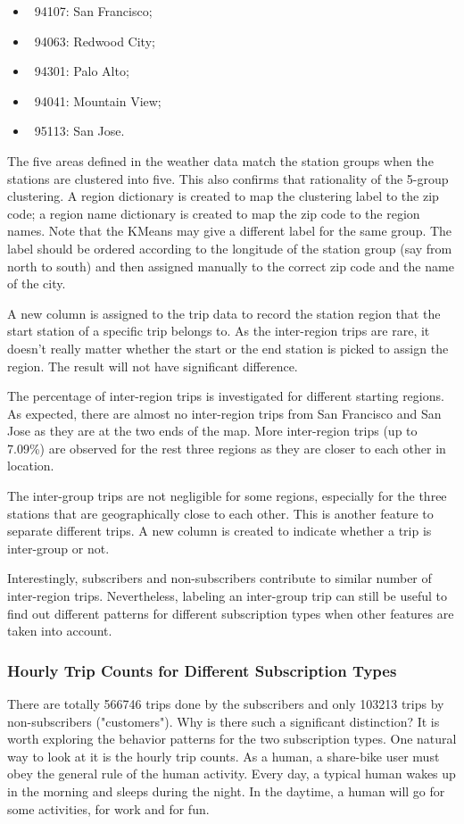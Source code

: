 \documentclass[a4paper]{article}
\begin{document}
			\begin{itemize}
				\item \ 94107: San Francisco;
				\item \ 94063: Redwood City;
				\item \ 94301: Palo Alto;
				\item \ 94041: Mountain View;
				\item \ 95113: San Jose.
			\end{itemize}    
			
			The five areas defined in the weather data match the station groups when the stations are clustered into five. This also confirms that rationality of the 5-group clustering. A region dictionary is created to map the clustering label to the zip code; a region name dictionary is created to map the zip code to the region names. Note that the KMeans may give a different label for the same group. The label should be ordered according to the longitude of the station group (say from north to south) and then assigned manually to the correct zip code and the name of the city.
			
			A new column is assigned to the trip data to record the station region that the start station of a specific trip belongs to. As the inter-region trips are rare, it doesn't really matter whether the start or the end station is picked to assign the region. The result will not have significant difference.
			
			The percentage of inter-region trips is investigated for different starting regions. As expected, there are almost no inter-region trips from San Francisco and San Jose as they are at the two ends of the map. More inter-region trips (up to 7.09\%) are observed for the rest three regions as they are closer to each other in location. 
			
			The inter-group trips are not negligible for some regions, especially for the three stations that are geographically close to each other. This is another feature to separate different trips. A new column is created to indicate whether a trip is inter-group or not. 
			
			Interestingly, subscribers and non-subscribers contribute to similar number of inter-region trips. Nevertheless, labeling an inter-group trip can still be useful to find out different patterns for different subscription types when other features are taken into account.
			
			\subsubsection{Hourly Trip Counts for Different Subscription Types}
			There are totally 566746 trips done by the subscribers and only 103213 trips by non-subscribers ("customers"). Why is there such a significant distinction? It is worth exploring the behavior patterns for the two subscription types. One natural way to look at it is the hourly trip counts. As a human, a share-bike user must obey the general rule of the human activity. Every day, a typical human wakes up in the morning and sleeps during the night. In the daytime, a human will go for some activities, for work and for fun. 
			
\end{document}
